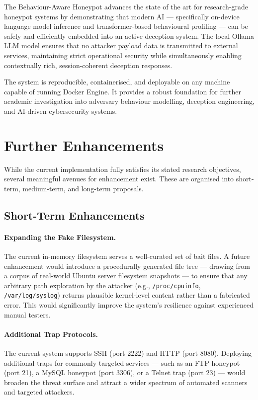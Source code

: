 The Behaviour-Aware Honeypot advances the state of the art for research-grade honeypot systems by demonstrating that modern AI — specifically on-device language model inference and transformer-based behavioural profiling — can be safely and efficiently embedded into an active deception system. The local Ollama LLM model ensures that no attacker payload data is transmitted to external services, maintaining strict operational security while simultaneously enabling contextually rich, session-coherent deception responses.

The system is reproducible, containerised, and deployable on any machine capable of running Docker Engine. It provides a robust foundation for further academic investigation into adversary behaviour modelling, deception engineering, and AI-driven cybersecurity systems.

\section{Further Enhancements}

While the current implementation fully satisfies its stated research objectives, several meaningful avenues for enhancement exist. These are organised into short-term, medium-term, and long-term proposals.

\subsection{Short-Term Enhancements}

\paragraph{Expanding the Fake Filesystem.}
The current in-memory filesystem serves a well-curated set of bait files. A future enhancement would introduce a procedurally generated file tree — drawing from a corpus of real-world Ubuntu server filesystem snapshots — to ensure that any arbitrary path exploration by the attacker (e.g., \texttt{/proc/cpuinfo}, \texttt{/var/log/syslog}) returns plausible kernel-level content rather than a fabricated error. This would significantly improve the system's resilience against experienced manual testers.

\paragraph{Additional Trap Protocols.}
The current system supports SSH (port 2222) and HTTP (port 8080). Deploying additional traps for commonly targeted services — such as an FTP honeypot (port 21), a MySQL honeypot (port 3306), or a Telnet trap (port 23) — would broaden the threat surface and attract a wider spectrum of automated scanners and targeted attackers.

